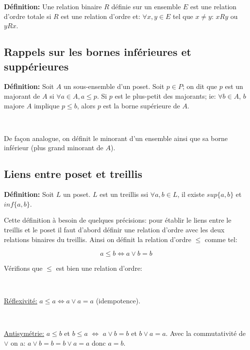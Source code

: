 \documentclass[a4paper, 11pt]{article}
\begin{document}
\begin{tcolorbox} 
	\textbf{Définition:} Une relation binaire $R$ définie sur un ensemble $E$ est une relation d'ordre totale si $R$ est une relation d'ordre et:
	$\forall x,y \in E$ tel que $x \neq y$: $xRy$ ou $yRx$.
\end{tcolorbox}

\subsection{Rappels sur les bornes inférieures et suppérieures}

\begin{tcolorbox} 
	\textbf{Définition:} Soit $A$ un sous-ensemble d'un poset. Soit $p \in P$; on dit que $p$ est un majorant de $A$ si $\forall a \in A, a \leq p$. Si $p$ est le plus-petit des majorants; ie: $\forall b \in A$, $b$ majore $A$ implique $p \leq b$, alors $p$ est la borne supérieure de $A$.

\

	De façon analogue, on définit le minorant d'un ensemble ainsi que sa borne inférieur (plus grand minorant de $A$).

\end{tcolorbox}

\subsection{Liens entre poset et treillis}

\begin{tcolorbox} 
	\textbf{Définition:} Soit $L$ un poset. $L$ est un treillis ssi $\forall a,b \in L$, il existe $sup\{a,b\}$ et $inf\{a,b\}$.
\end{tcolorbox}

Cette définition à besoin de quelques précisions: pour établir le liens entre le treillis et le poset il faut d'abord définir une relation d'ordre avec les deux relations binaires du treillis. Ainsi on définit la relation d'ordre $\leq$ comme tel:

$$a \leq b \Leftrightarrow a \lor b = b$$

Vérifions que $\leq$ est bien une relation d'ordre:

\

\underline{Réflexivité:} $a \leq a \Leftrightarrow a \lor a = a$ (idempotence).

\

\underline{Antisymétrie:} $a \leq b$ et $b \leq a$ $\Leftrightarrow$ $a \lor b = b$ et $b \lor a = a$. Avec la commutativité de $\lor$ on a: $a \lor b = b = b \lor a = a$ donc $a = b$.
\end{document}
